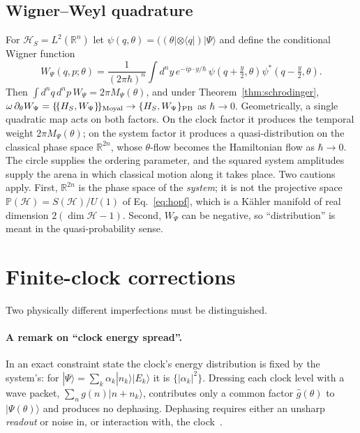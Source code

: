 \documentclass[aps,prd,onecolumn,notitlepage,10pt,amsmath,amssymb,amsfonts,nofootinbib]{revtex4-2}
\theoremstyle{definition}
\theoremstyle{remark}
\newcommand{\Hil}{\mathcal{H}}
\newcommand{\R}{\mathbb{R}}
\newcommand{\pbra}[1]{(#1|}
\begin{document}
\subsection{Wigner--Weyl quadrature}
For $\Hil_S=L^2(\R^n)$ let $\psi(q,\theta)=(\pbra{\theta}\otimes\langle q|)|\Psi\rangle$ and define the conditional Wigner function
\begin{equation}
  W_\Psi(q,p;\theta)=\frac{1}{(2\pi\hbar)^n}\int d^ny\,e^{-ip\cdot y/\hbar}\,\psi\!\left(q+\tfrac y2,\theta\right)\psi^*\!\left(q-\tfrac y2,\theta\right).
  \label{eq:wigner}
\end{equation}
Then $\int d^nq\,d^np\,W_\Psi=2\pi M_\Psi(\theta)$, and under Theorem~\ref{thm:schrodinger}, $\omega\,\partial_\theta W_\Psi=\{\!\{H_S,W_\Psi\}\!\}_{\rm Moyal}\to\{H_S,W_\Psi\}_{\rm PB}$ as $\hbar\to0$. Geometrically, a single quadratic map acts on both factors. On the clock factor it produces the temporal weight $2\pi M_\Psi(\theta)$; on the system factor it produces a quasi-distribution on the classical phase space $\R^{2n}$, whose $\theta$-flow becomes the Hamiltonian flow as $\hbar\to0$. The circle supplies the ordering parameter, and the squared system amplitudes supply the arena in which classical motion along it takes place. Two cautions apply. First, $\R^{2n}$ is the phase space of the \emph{system}; it is not the projective space $\mathbb P(\Hil)=S(\Hil)/U(1)$ of Eq.~\eqref{eq:hopf}, which is a K\"ahler manifold of real dimension $2(\dim\Hil-1)$. Second, $W_\Psi$ can be negative, so ``distribution'' is meant in the quasi-probability sense.

\section{Finite-clock corrections}
\label{sec:finite}

Two physically different imperfections must be distinguished.

\paragraph*{A remark on ``clock energy spread''.}
In an exact constraint state the clock's energy distribution is fixed by the system's: for $|\Psi\rangle=\sum_k\alpha_k|n_k\rangle|E_k\rangle$ it is $\{|\alpha_k|^2\}$. Dressing each clock level with a wave packet, $\sum_ng(n)|n+n_k\rangle$, contributes only a common factor $\hat g(\theta)$ to $|\Psi(\theta)\rangle$ and produces no dephasing. Dephasing requires either an unsharp \emph{readout} or noise in, or interaction with, the clock~\cite{SmithAhmadi2019}.
\end{document}
